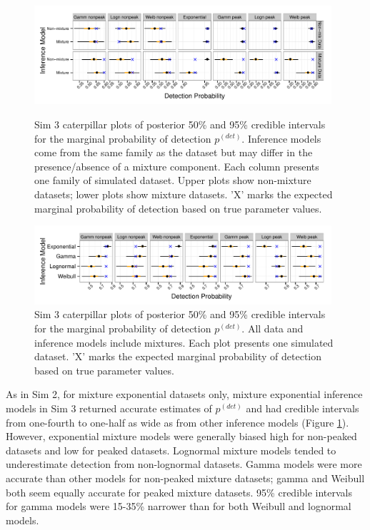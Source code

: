 \documentclass[useAMS,usenatbib,referee,12pt]{article}
\begin{document}
\begin{figure}[h!]\centering
\includegraphics[width=0.98\textwidth]{Sims/SimFull/pdet_cater_correct.pdf}
\caption{\label{pdet_cater_correct} Sim 3 caterpillar plots of posterior 50\% and 95\% credible intervals for the marginal probability of detection $p^{(det)}$.  Inference models come from the same family as the dataset but may differ in the presence/absence of a mixture component.  Each column presents one family of simulated dataset.  Upper plots show non-mixture datasets; lower plots show mixture datasets.  'X' marks the expected marginal probability of detection based on true parameter values.}
\includegraphics[width=0.98\textwidth]{Sims/SimFull/pdet_cater_family.pdf}
\caption{\label{pdet_cater_family}  Sim 3 caterpillar plots of posterior 50\% and 95\% credible intervals for the marginal probability of detection $p^{(det)}$. All data and inference models include mixtures.  Each plot presents one simulated dataset.  'X' marks the expected marginal probability of detection based on true parameter values.}
\end{figure}

As in Sim 2, for mixture exponential datasets only, mixture exponential inference models in Sim 3 returned accurate estimates of $p^{(det)}$ and had credible intervals from one-fourth to one-half as wide as from other inference models (Figure \ref{pdet_cater_family}).  However, exponential mixture models were generally biased high for non-peaked datasets and low for peaked datasets.  Lognormal mixture models tended to underestimate detection from non-lognormal datasets.  Gamma models were more accurate than other models for non-peaked mixture datasets; gamma and Weibull both seem equally accurate for peaked mixture datasets.  95\% credible intervals for gamma models were 15-35\% narrower than for both Weibull and lognormal models.
\end{document}
